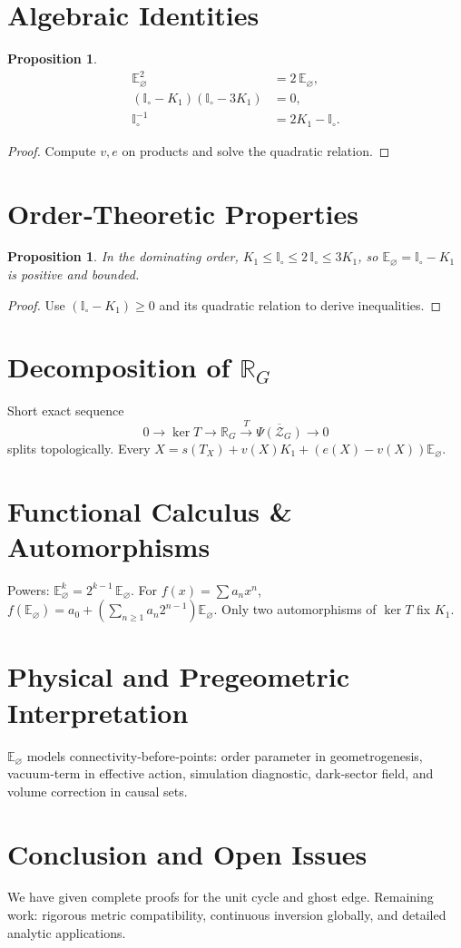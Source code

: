 \documentclass[11pt]{article}
\theoremstyle{definition}
\theoremstyle{plain}
\newtheorem{proposition}[definition]{Proposition}
\theoremstyle{remark}
\begin{document}
\section{Algebraic Identities}
\begin{proposition}
\begin{align*}
\mathbb E_\varnothing^2 &= 2\,\mathbb E_\varnothing,\\
(\mathbb I_\circ-K_1)(\mathbb I_\circ-3K_1)&=0,\\
\mathbb I_\circ^{-1}&=2K_1-\mathbb I_\circ.
\end{align*}
\end{proposition}
\begin{proof}
Compute $v,e$ on products and solve the quadratic relation.
\end{proof}

\section{Order‐Theoretic Properties}
\begin{proposition}
In the dominating order, $K_1\le\mathbb I_\circ\le2\,\mathbb I_\circ\le3K_1$, so $\mathbb E_\varnothing=\mathbb I_\circ-K_1$ is positive and bounded.
\end{proposition}
\begin{proof}
Use $(\mathbb I_\circ-K_1)\ge0$ and its quadratic relation to derive inequalities.
\end{proof}

\section{Decomposition of $\mathbb R_G$}
Short exact sequence
\[0\to\ker T\to\mathbb R_G\xrightarrow{T}\overline{\Psi(\mathcal Z_G)}\to0\]
splits topologically.  Every $X=s(T_X)+v(X)K_1+(e(X)-v(X))\mathbb E_\varnothing$.

\section{Functional Calculus & Automorphisms}
Powers: $\mathbb E_\varnothing^k=2^{k-1}\,\mathbb E_\varnothing$.  For $f(x)=\sum a_nx^n$, $f(\mathbb E_\varnothing)=a_0+(\sum_{n\ge1}a_n2^{n-1})\mathbb E_\varnothing$.  Only two automorphisms of $\ker T$ fix $K_1$.

\section{Physical and Pregeometric Interpretation}
$\mathbb E_\varnothing$ models connectivity‐before‐points: order parameter in geometrogenesis, vacuum‐term in effective action, simulation diagnostic, dark‐sector field, and volume correction in causal sets.

\section{Conclusion and Open Issues}
We have given complete proofs for the unit cycle and ghost edge.  Remaining work: rigorous metric compatibility, continuous inversion globally, and detailed analytic applications.
\end{document}
